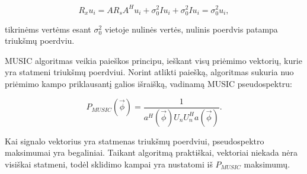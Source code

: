 \documentclass[main.tex]{subfiles}
\begin{document}
\begin{equation}
    R_xu_i=AR_sA^Hu_i+\sigma^2_0Iu_i+\sigma^2_0Iu_i=\sigma^2_0u_i,
\end{equation}

\noindent tikrinėms vertėms esant $\sigma^2_0$ vietoje nulinės vertės, nulinis
poerdvis patampa triukšmų poerdviu.

MUSIC algoritmas veikia paieškos principu, ieškant visų priėmimo vektorių, kurie
yra statmeni triukšmų poerdviui. Norint atlikti paiešką, algoritmas sukuria
nuo priėmimo kampo priklausantį galios išraišką, vadinamą MUSIC pseudospektru:

\begin{equation}
    P_{MUSIC}(\overrightarrow{\phi}) = \frac{1}{a^H(\overrightarrow{\phi})U_nU_n^Ha(\overrightarrow{\phi})}.
\end{equation}

\noindent Kai signalo vektorius yra statmenas triukšmų poerdviui, pseudospektro maksimumai
yra begaliniai. Taikant algoritmą praktiškai, vektoriai niekada nėra visiškai statmeni,
todėl sklidimo kampai yra nustatomi iš $P_{MUSIC}$ maksimumų.
\end{document}

